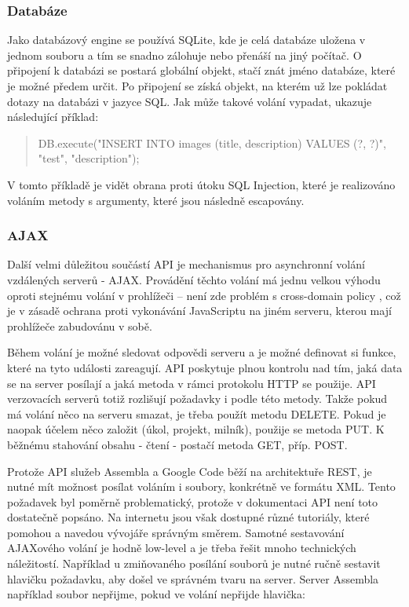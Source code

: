 \subsubsection{Databáze}

Jako databázový engine se používá SQLite\cite{sqlite}, kde je celá databáze uložena v jednom souboru a tím se snadno zálohuje nebo přenáší na jiný počítač. O připojení k databázi se postará globální objekt, stačí znát jméno databáze, které je možné předem určit. Po připojení se získá objekt, na kterém už lze pokládat dotazy na databázi v jazyce SQL. Jak může takové volání vypadat, ukazuje následující příklad:

\begin{quote}
DB.execute("INSERT INTO images (title, description) VALUES (?, ?)", "test", "description");
\end{quote}

V tomto příkladě je vidět obrana proti útoku SQL Injection, které je realizováno voláním metody s argumenty, které jsou následně escapovány.

\subsubsection{AJAX}

Další velmi důležitou součástí API je mechanismus pro asynchronní volání vzdálených serverů - AJAX. Provádění těchto volání má jednu velkou výhodu oproti stejnému volání v prohlížeči – není zde problém s cross-domain policy \cite{wiki:sameorigin}, což je v zásadě ochrana proti vykonávání JavaScriptu na jiném serveru, kterou mají prohlížeče zabudovánu v sobě. 

Během volání je možné sledovat odpovědi serveru a je možné definovat si funkce, které na tyto události zareagují. API poskytuje plnou kontrolu nad tím, jaká data se na server posílají a jaká metoda v rámci protokolu HTTP se použije. API verzovacích serverů totiž rozlišují požadavky i podle této metody. Takže pokud má volání něco na serveru smazat, je třeba použít metodu DELETE. Pokud je naopak účelem něco založit (úkol, projekt, milník), použije se metoda PUT. K běžnému stahování obsahu - čtení - postačí metoda GET, příp. POST.

Protože API služeb Assembla a Google Code běží na architektuře REST, je nutné mít možnost posílat voláním i soubory, konkrétně ve formátu XML. Tento požadavek byl poměrně problematický, protože v dokumentaci API není toto dostatečně popsáno. Na internetu jsou však dostupné různé tutoriály, které pomohou a navedou vývojáře správným směrem. Samotné sestavování AJAXového volání je hodně low-level a je třeba řešit mnoho technických náležitostí. Například u zmiňovaného posílání souborů je nutné ručně sestavit hlavičku požadavku, aby došel ve správném tvaru na server. Server Assembla například soubor nepřijme, pokud ve volání nepřijde hlavička:

